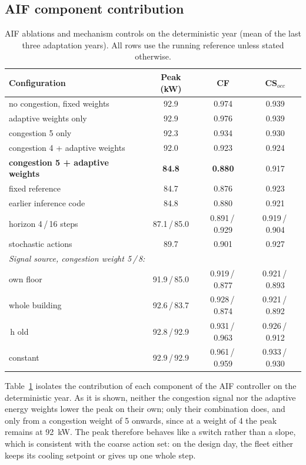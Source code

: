 \documentclass[conference]{IEEEtran}
\begin{document}
\subsection{AIF component contribution}
\label{sec:mechanism}

\begin{table}[t]
\caption{AIF ablations and mechanism controls on the deterministic year (mean
of the last three adaptation years). All rows use the running reference
unless stated otherwise.}
\label{tab:ablation}
\centering
\footnotesize
\setlength{\tabcolsep}{2pt}
\begin{tabular}{lccc}
\toprule
Configuration & Peak (kW) & CF & CS$_{occ}$ \\
\midrule
no congestion, fixed weights       & 92.9 & 0.974 & 0.939 \\
adaptive weights only              & 92.9 & 0.976 & 0.939 \\
congestion 5 only                  & 92.3 & 0.934 & 0.930 \\
congestion 4 + adaptive weights    & 92.0 & 0.923 & 0.924 \\
\textbf{congestion 5 + adaptive weights} & \textbf{84.8} & \textbf{0.880} & 0.917 \\
\quad fixed reference              & 84.7 & 0.876 & 0.923 \\
\quad earlier inference code       & 84.8 & 0.880 & 0.921 \\
\quad horizon 4\,/\,16 steps       & 87.1\,/\,85.0 & 0.891\,/\,0.929 & 0.919\,/\,0.904 \\
\quad stochastic actions           & 89.7 & 0.901 & 0.927 \\
\midrule
\multicolumn{4}{l}{\emph{Signal source, congestion weight 5\,/\,8:}} \\
\quad own floor                    & 91.9\,/\,85.0 & 0.919\,/\,0.877 & 0.921\,/\,0.893 \\
\quad whole building               & 92.6\,/\,83.7 & 0.928\,/\,0.874 & 0.921\,/\,0.892 \\
\quad 24\,h old                    & 92.8\,/\,92.9 & 0.931\,/\,0.963 & 0.926\,/\,0.912 \\
\quad constant                     & 92.9\,/\,92.9 & 0.961\,/\,0.959 & 0.933\,/\,0.930 \\
\bottomrule
\end{tabular}
\end{table}

Table~\ref{tab:ablation} isolates the contribution of each component of the AIF
controller on the deterministic year. As it is shown,
neither the congestion signal nor the adaptive energy weights lower the peak on
their own; only their combination does, and only from a congestion weight of 5
onwards, since at a weight of 4 the peak remains at \SI{92}{\kilo\watt}. The
peak therefore behaves like a switch rather than a slope, which is consistent
with the coarse action set: on the design day, the fleet either keeps its
cooling setpoint or gives up one whole step.
\end{document}

